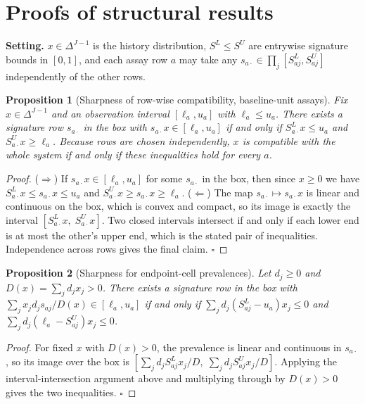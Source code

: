 \documentclass[11pt]{article}
\newtheorem{proposition}{Proposition}
\begin{document}
\appendix
\section{Proofs of structural results}
\textbf{Setting.} $x\in\Delta^{J-1}$ is the history distribution, $S^L\le S^U$ are entrywise signature bounds in $[0,1]$, and each assay row $a$ may take any $s_{a\cdot}\in\prod_j[S^L_{aj},S^U_{aj}]$ independently of the other rows.

\begin{proposition}[Sharpness of row-wise compatibility, baseline-unit assays]
Fix $x\in\Delta^{J-1}$ and an observation interval $[\ell_a,u_a]$ with $\ell_a\le u_a$. There exists a signature row $s_{a\cdot}$ in the box with $s_{a\cdot}x\in[\ell_a,u_a]$ if and only if $S^L_{a\cdot}x\le u_a$ and $S^U_{a\cdot}x\ge\ell_a$. Because rows are chosen independently, $x$ is compatible with the whole system if and only if these inequalities hold for every $a$.
\end{proposition}
\begin{proof}
($\Rightarrow$) If $s_{a\cdot}x\in[\ell_a,u_a]$ for some $s_{a\cdot}$ in the box, then since $x\ge0$ we have $S^L_{a\cdot}x\le s_{a\cdot}x\le u_a$ and $S^U_{a\cdot}x\ge s_{a\cdot}x\ge\ell_a$. ($\Leftarrow$) The map $s_{a\cdot}\mapsto s_{a\cdot}x$ is linear and continuous on the box, which is convex and compact, so its image is exactly the interval $[S^L_{a\cdot}x,\;S^U_{a\cdot}x]$. Two closed intervals intersect if and only if each lower end is at most the other's upper end, which is the stated pair of inequalities. Independence across rows gives the final claim. $\square$
\end{proof}

\begin{proposition}[Sharpness for endpoint-cell prevalences]
Let $d_j\ge0$ and $D(x)=\sum_jd_jx_j>0$. There exists a signature row in the box with $\sum_jx_jd_js_{aj}/D(x)\in[\ell_a,u_a]$ if and only if $\sum_jd_j(S^L_{aj}-u_a)x_j\le0$ and $\sum_jd_j(\ell_a-S^U_{aj})x_j\le0$.
\end{proposition}
\begin{proof}
For fixed $x$ with $D(x)>0$, the prevalence is linear and continuous in $s_{a\cdot}$, so its image over the box is $[\sum_jd_jS^L_{aj}x_j/D,\;\sum_jd_jS^U_{aj}x_j/D]$. Applying the interval-intersection argument above and multiplying through by $D(x)>0$ gives the two inequalities. $\square$
\end{proof}
\end{document}
